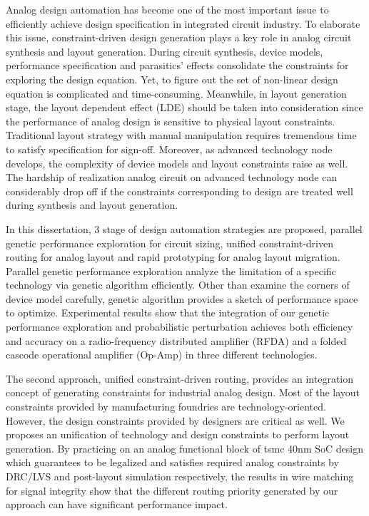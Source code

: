 
Analog design automation has become one of the most important issue to efficiently achieve design specification in integrated circuit industry. To elaborate this issue, constraint-driven design generation plays a key role in analog circuit synthesis and layout generation. During circuit synthesis, device models, performance specification and parasitics' effects consolidate the constraints for exploring the design equation. Yet, to figure out the set of non-linear design equation is complicated and time-consuming. Meanwhile, in layout generation stage, the layout dependent effect (LDE) should be taken into consideration since the performance of analog design is sensitive to physical layout constraints. Traditional layout strategy with manual manipulation requires tremendous time to satisfy specification for sign-off. Moreover, as advanced technology node develops, the complexity of device models and layout constraints raise as well. The hardship of realization analog circuit on advanced technology node can considerably drop off if the constraints corresponding to design are treated well during synthesis and layout generation.

In this dissertation, 3 stage of design automation strategies are proposed, parallel genetic performance exploration for circuit sizing, unified constraint-driven routing for analog layout and rapid prototyping for analog layout migration. Parallel genetic performance exploration analyze the limitation of a specific technology via genetic algorithm efficiently. Other than examine the corners of device model carefully, genetic algorithm provides a sketch of performance space to optimize. Experimental results show that the integration of our genetic performance exploration and probabilistic perturbation achieves both efficiency and accuracy on a radio-frequency distributed amplifier (RFDA) and a folded cascode operational amplifier (Op-Amp) in three different technologies.

The second approach, unified constraint-driven routing, provides an integration concept of generating constraints for industrial analog design. Most of the layout constraints provided by manufacturing foundries are technology-oriented. However, the design constraints provided by designers are critical as well. We proposes an unification of technology and design constraints to perform layout generation. By practicing on an analog functional block of tsmc 40nm SoC design which guarantees to be legalized and satisfies required analog constraints by DRC/LVS and post-layout simulation respectively, the results in wire matching for signal integrity show that the different routing priority generated by our approach can have significant performance impact.

